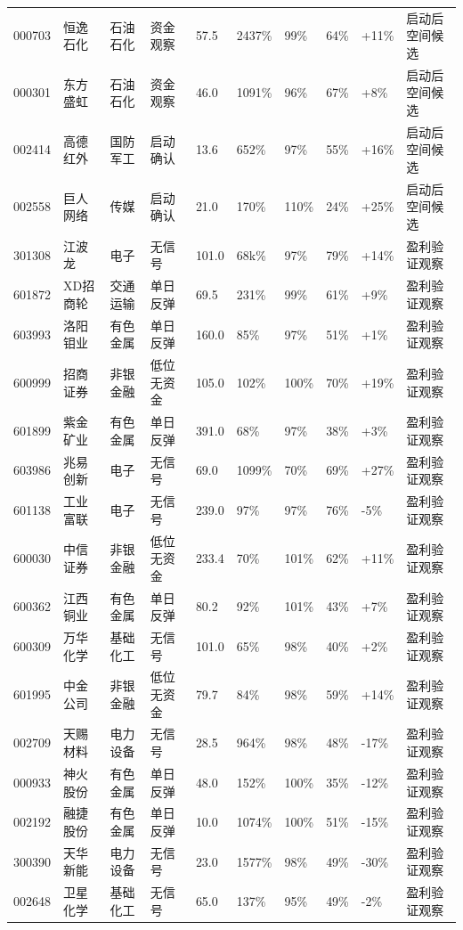 \begin{longtable}{L{1.05cm}L{1.55cm}L{1.45cm}L{1.25cm}R{0.90cm}R{0.90cm}R{0.90cm}R{0.95cm}R{0.95cm}L{2.05cm}}
000703 & 恒逸石化 & 石油石化 & 资金观察 & 57.5 & 2437\% & 99\% & 64\% & +11\% & 启动后空间候选 \\
000301 & 东方盛虹 & 石油石化 & 资金观察 & 46.0 & 1091\% & 96\% & 67\% & +8\% & 启动后空间候选 \\
002414 & 高德红外 & 国防军工 & 启动确认 & 13.6 & 652\% & 97\% & 55\% & +16\% & 启动后空间候选 \\
002558 & 巨人网络 & 传媒 & 启动确认 & 21.0 & 170\% & 110\% & 24\% & +25\% & 启动后空间候选 \\
301308 & 江波龙 & 电子 & 无信号 & 101.0 & 68k\% & 97\% & 79\% & +14\% & 盈利验证观察 \\
601872 & XD招商轮 & 交通运输 & 单日反弹 & 69.5 & 231\% & 99\% & 61\% & +9\% & 盈利验证观察 \\
603993 & 洛阳钼业 & 有色金属 & 单日反弹 & 160.0 & 85\% & 97\% & 51\% & +1\% & 盈利验证观察 \\
600999 & 招商证券 & 非银金融 & 低位无资金 & 105.0 & 102\% & 100\% & 70\% & +19\% & 盈利验证观察 \\
601899 & 紫金矿业 & 有色金属 & 单日反弹 & 391.0 & 68\% & 97\% & 38\% & +3\% & 盈利验证观察 \\
603986 & 兆易创新 & 电子 & 无信号 & 69.0 & 1099\% & 70\% & 69\% & +27\% & 盈利验证观察 \\
601138 & 工业富联 & 电子 & 无信号 & 239.0 & 97\% & 97\% & 76\% & -5\% & 盈利验证观察 \\
600030 & 中信证券 & 非银金融 & 低位无资金 & 233.4 & 70\% & 101\% & 62\% & +11\% & 盈利验证观察 \\
600362 & 江西铜业 & 有色金属 & 单日反弹 & 80.2 & 92\% & 101\% & 43\% & +7\% & 盈利验证观察 \\
600309 & 万华化学 & 基础化工 & 无信号 & 101.0 & 65\% & 98\% & 40\% & +2\% & 盈利验证观察 \\
601995 & 中金公司 & 非银金融 & 低位无资金 & 79.7 & 84\% & 98\% & 59\% & +14\% & 盈利验证观察 \\
002709 & 天赐材料 & 电力设备 & 无信号 & 28.5 & 964\% & 98\% & 48\% & -17\% & 盈利验证观察 \\
000933 & 神火股份 & 有色金属 & 单日反弹 & 48.0 & 152\% & 100\% & 35\% & -12\% & 盈利验证观察 \\
002192 & 融捷股份 & 有色金属 & 单日反弹 & 10.0 & 1074\% & 100\% & 51\% & -15\% & 盈利验证观察 \\
300390 & 天华新能 & 电力设备 & 无信号 & 23.0 & 1577\% & 98\% & 49\% & -30\% & 盈利验证观察 \\
002648 & 卫星化学 & 基础化工 & 无信号 & 65.0 & 137\% & 95\% & 49\% & -2\% & 盈利验证观察 \\

\end{longtable}
